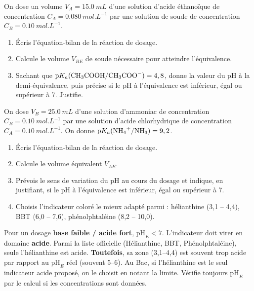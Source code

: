 \documentclass[11pt]{article}
\begin{document}
\begin{exercice}
On dose un volume $V_A = \SI{15,0}{mL}$ d'une solution d'acide éthanoïque de concentration $C_A = \SI{0,080}{mol.L^{-1}}$ par une solution de soude de concentration $C_B = \SI{0,10}{mol.L^{-1}}$.
\begin{enumerate}
\item Écris l'équation-bilan de la réaction de dosage.
\item Calcule le volume $V_{BE}$ de soude nécessaire pour atteindre l'équivalence.
\item Sachant que $\mathrm{p}K_a(\ce{CH3COOH}/\ce{CH3COO-}) = 4,8$, donne la valeur du pH à la demi-équivalence, puis précise si le pH à l'équivalence est inférieur, égal ou supérieur à 7. Justifie.
\end{enumerate}
\end{exercice}

\begin{exercice}
On dose $V_B = \SI{25,0}{mL}$ d'une solution d'ammoniac de concentration $C_B = \SI{0,10}{mol.L^{-1}}$ par une solution d'acide chlorhydrique de concentration $C_A = \SI{0,10}{mol.L^{-1}}$. On donne $\mathrm{p}K_a(\ce{NH4+}/\ce{NH3}) = 9,2$.
\begin{enumerate}
\item Écris l'équation-bilan de la réaction de dosage.
\item Calcule le volume équivalent $V_{AE}$.
\item Prévois le sens de variation du pH au cours du dosage et indique, en justifiant, si le pH à l'équivalence est inférieur, égal ou supérieur à 7.
\item Choisis l'indicateur coloré le mieux adapté parmi : hélianthine (3,1 -- 4,4), BBT (6,0 -- 7,6), phénolphtaléine (8,2 -- 10,0).
\end{enumerate}
\end{exercice}

\begin{attention}
Pour un dosage \textbf{base faible / acide fort}, $\mathrm{pH}_E < 7$. L'indicateur doit virer en domaine \textbf{acide}. Parmi la liste officielle (Hélianthine, BBT, Phénolphtaléine), seule l'hélianthine est acide. \textbf{Toutefois}, sa zone (3,1--4,4) est souvent trop acide par rapport au $\mathrm{pH}_E$ réel (souvent 5--6). Au Bac, si l'hélianthine est le seul indicateur acide proposé, on le choisit en notant la limite. Vérifie toujours $\mathrm{pH}_E$ par le calcul si les concentrations sont données.
\end{attention}
\end{document}
